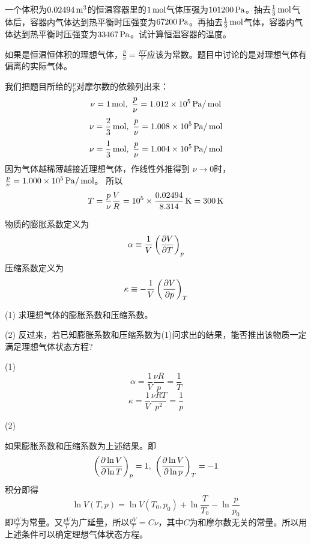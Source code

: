 \documentclass[CJK]{beamer}
\begin{document}
\begin{frame}
  \chtitle{\proid (\stwo)}
  \bch
一个体积为$0.02494\,\mathrm{m}^3$的恒温容器里的$1\,\mathrm{mol}$气体压强为$101200 \,\mathrm{Pa}$。抽去$\frac{1}{3}\,\mathrm{mol}$气体后，容器内气体达到热平衡时压强变为$67200\,\mathrm{Pa}$。再抽去$\frac{1}{3}\,\mathrm{mol}$气体，容器内气体达到热平衡时压强变为$33467\,\mathrm{Pa}$。试计算恒温容器的温度。 
  \ech
\end{frame}

\begin{frame}
  \bch
  如果是恒温恒体积的理想气体，$\frac{p}{\nu} = \frac{RT}{V}$应该为常数。题目中讨论的是对理想气体有偏离的实际气体。
  
  我们把题目所给的$\frac{p}{\nu}$对摩尔数的依赖列出来：
  $$ \nu = 1\,\mathrm{mol},\ \frac{p}{\nu } = 1.012\times 10^5 \,\mathrm{Pa}/\,\mathrm{mol}$$
  $$ \nu = \frac{2}{3}\,\mathrm{mol},\ \frac{p}{\nu } = 1.008\times 10^5 \,\mathrm{Pa}/\,\mathrm{mol} $$
  $$ \nu = \frac{1}{3}\,\mathrm{mol},\ \frac{p}{\nu } = 1.004\times 10^5 \,\mathrm{Pa}/\,\mathrm{mol}$$
  因为气体越稀薄越接近理想气体，作线性外推得到
  $ \nu \rightarrow 0$时，  $\frac{p}{\nu} = 1.000\times 10^5\,\mathrm{Pa}/\,\mathrm{mol}$。
  所以
  $$ T = \frac{p}{\nu} \frac{V}{R} = 10^5\times \frac{0.02494}{8.314} \,\mathrm{K} = 300\,\mathrm{K}$$
  
  \ech
\end{frame}


\begin{frame}
  \chtitle{\proid (\stwo)}
  \bch
  物质的膨胀系数定义为
  $$\alpha \equiv \frac{1}{V}\left(\frac{\partial V}{\partial T}\right)_{p} $$
  压缩系数定义为
  $$\kappa \equiv -\frac{1}{V}\left(\frac{\partial V}{\partial p}\right)_{T} $$
  \bitem
\item[(1)]{求理想气体的膨胀系数和压缩系数。}
\item[(2)]{反过来，若已知膨胀系数和压缩系数为(1)问求出的结果，能否推出该物质一定满足理想气体状态方程?}
  \eitem
  \ech
\end{frame}

\begin{frame}
  \bch
  {\small
  \bitem
\item[(1)]{$$\alpha = \frac{1}{V}\frac{\nu R}{p} = \frac{1}{T}$$
  $$\kappa = \frac{1}{V}\frac{\nu RT}{p^2} = \frac{1}{p}$$
}
\item[(2)]{如果膨胀系数和压缩系数为上述结果。即
  $$\left(\frac{\partial \ln V}{\partial \ln T}\right)_{p} = 1,\ \left(\frac{\partial \ln V}{\partial \ln p}\right)_{T} = -1$$
  积分即得
  $$ \ln V(T, p)  = \ln V(T_0, p_0) + \ln\frac{T}{T_0} - \ln\frac{p}{p_0} $$
  即$\frac{pV}{T}$为常量。又$\frac{pV}{T}$为广延量，所以$\frac{pV}{T} = C\nu$，其中$C$为和摩尔数无关的常量。所以用上述条件可以确定理想气体状态方程。
  
}  
  \eitem
  }
  \ech
\end{frame}
\end{document}
